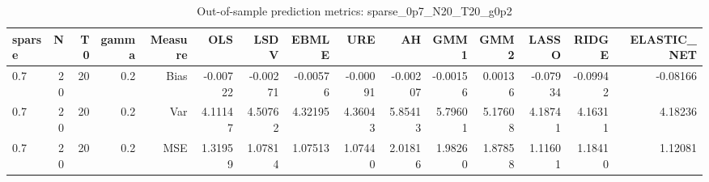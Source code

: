 \begin{table}[!htbp]\centering
\caption{Out-of-sample prediction metrics: sparse_0p7_N20_T20_g0p2}
\label{tab:table3_sparse_0p7_N20_T20_g0p2}
\begin{tabular}{lrrrrrrrrrrrrrr}
\hline
sparse & N & T0 & gamma & Measure & OLS & LSDV & EBMLE & URE & AH & GMM1 & GMM2 & LASSO & RIDGE & ELASTIC_NET \\
\hline
0.7 & 20 & 20 & 0.2 & Bias & -0.00722 & -0.00271 & -0.00576 & -0.00091 & -0.00207 & -0.00156 & 0.00136 & -0.07934 & -0.09942 & -0.08166 \\
0.7 & 20 & 20 & 0.2 & Var & 4.11147 & 4.50762 & 4.32195 & 4.36043 & 5.85413 & 5.79601 & 5.17608 & 4.18741 & 4.16311 & 4.18236 \\
0.7 & 20 & 20 & 0.2 & MSE & 1.31959 & 1.07814 & 1.07513 & 1.07440 & 2.01816 & 1.98260 & 1.87858 & 1.11601 & 1.18410 & 1.12081 \\
\hline
\end{tabular}
\end{table}

